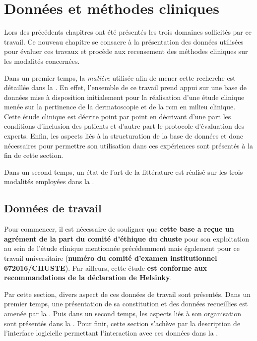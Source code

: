 \renewcommand{\thechapter}{\arabic{chapter}}
\setcounter{chapter}{3}

\chapter{Données et méthodes cliniques}
\label{chap:chapter_4}
\chapterintro
Lors des précédents chapitres ont été présentés les trois domaines sollicités par ce travail. Ce nouveau chapitre se consacre à la présentation des données utilisées pour évaluer ces travaux et procède aux recensement des méthodes cliniques sur les modalités concernées.\par

Dans un premier temps, la \textit{matière} utilisée afin de mener cette recherche est détaillée dans la . En effet, l'ensemble de ce travail prend appui sur une base de données mise à disposition initialement pour la réalisation d'une étude clinique menée sur la pertinence de la dermatoscopie et de la \acrlong{rcm} en milieu clinique. Cette étude clinique est décrite point par point en décrivant d'une part les conditions d'inclusion des patients et d'autre part le protocole d'évaluation des experts. Enfin, les aspects liés à la structuration de la base de données et donc nécessaires pour permettre son utilisation dans ces expériences sont présentés à la fin de cette section.\par

Dans un second temps, un état de l'art de la littérature est réalisé sur les trois modalités employées dans la .\par
\newpage

\section{Données de travail}
\label{sec:clinical_data}
Pour commencer, il est nécessaire de souligner que \textbf{cette base a reçue un agrément de la part du comité d'éthique du \acrfull{chuste}} pour son exploitation au sein de l'étude clinique mentionnée précédemment mais également pour ce travail universitaire (\textbf{numéro du comité d'examen institutionnel 672016/CHUSTE}). Par ailleurs, cette étude \textbf{est conforme aux recommandations de la déclaration de Helsinky}.\par

Par cette section, divers aspect de ces données de travail sont présentés. Dans un premier temps, une présentation de sa constitution et des données recueillies est amenée par la . Puis dans un second temps, les aspects liés à son organisation sont présentés dans la . Pour finir, cette section s'achève par la description de l'interface logicielle permettant l'interaction avec ces données dans la .


